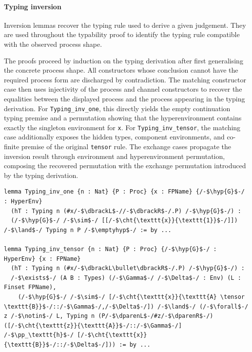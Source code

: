 \paragraph{Typing inversion}
Inversion lemmas recover the typing rule used to derive a given judgement. They are used throughout the typability proof to identify the typing rule compatible with the observed process shape.

The proofs proceed by induction on the typing derivation after first generalising the concrete process shape. All constructors whose conclusion cannot have the required process form are discharged by contradiction. The matching constructor case then uses injectivity of the process and channel constructors to recover the equalities between the displayed process and the process appearing in the typing derivation. For \texttt{Typing\_inv\_one}, this directly yields the empty continuation typing premise and a permutation showing that the hyperenvironment contains exactly the singleton environment for \texttt{x}. For \texttt{Typing\_inv\_tensor}, the matching case additionally exposes the hidden types, component environments, and co-finite premise of the original \texttt{tensor} rule. The exchange cases propagate the inversion result through environment and hyperenvironment permutation, composing the recovered permutation with the exchange permutation introduced by the typing derivation.

\begin{lstlisting}[language=Lean4,
  caption={Representative inversion lemmas for the typing relation. The \texttt{one} case recovers a singleton hyperenvironment and continuation typing derivation, while the \texttt{tensor} case recovers the hidden types, environments, and co-finite premise.},
  label={lst:app-inversion}]
lemma Typing_inv_one {n : Nat} {P : Proc} {x : FPName} {/-$\hyp{G}$-/ : HyperEnv}
  (hT : Typing n (#x/-$\dbrackL$-//-$\dbrackR$-/.P) /-$\hyp{G}$-/) :
  (/-$\hyp{G}$-/ /-$\sim$-/ [[/-$\cht{\texttt{x}}{\texttt{1}}$-/]]) /-$\land$-/ Typing n P /-$\emptyhyp$-/ := by ...

lemma Typing_inv_tensor {n : Nat} {P : Proc} {/-$\hyp{G}$-/ : HyperEnv} {x : FPName}
  (hT : Typing n (#x/-$\dbrackL\bullet\dbrackR$-/.P) /-$\hyp{G}$-/) :
  /-$\exists$-/ (A B : Types) (/-$\Gamma$-/ /-$\Delta$-/ : Env) (L : Finset FPName),
    (/-$\hyp{G}$-/ /-$\sim$-/ [/-$\cht{\texttt{x}}{\texttt{A} \tensor \texttt{B}}$-/::/-$\Gamma$-/,/-$\Delta$-/]) /-$\land$-/ (/-$\forall$-/ z /-$\notin$-/ L, Typing n (P/-$\dparenL$-/#z/-$\dparenR$-/) ([/-$\cht{\texttt{z}}{\texttt{A}}$-/::/-$\Gamma$-/] /-$\pp_\texttt{h}$-/ [/-$\cht{\texttt{x}}{\texttt{B}}$-/::/-$\Delta$-/])) := by ...
\end{lstlisting}

